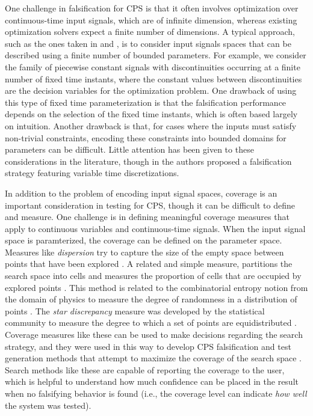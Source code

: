 One challenge in falsification for CPS is that it often
involves optimization over continuous-time input signals, which are of infinite 
dimension, whereas existing optimization solvers expect a finite number of 
dimensions. 
A typical approach, such as the ones taken in \cite{BreachCAV10} and 
\cite{Nghiem10}, is to consider input signals spaces that can be described using a
finite number of bounded parameters. For example, we consider the family of
piecewise constant signals with discontinuities occurring at a finite number of fixed time instants, where the
constant values between discontinuities are the decision variables for the optimization
problem. One drawback of using this type of fixed time parameterization 
is that the falsification performance depends on the selection of the fixed time instants, 
which is often based largely on intuition. Another drawback is that, for cases where the
inputs must satisfy non-trivial constraints, encoding these constraints 
into bounded domains for parameters can be difficult. Little attention has
been given to these considerations in the literature, though in 
\cite{DBLP:conf/atva/DeshmukhJKM15} the authors proposed a
falsification strategy featuring variable time discretizations.

In addition to the problem of encoding input signal spaces, coverage is an important consideration in testing for CPS, though it can be 
difficult to define and measure.
One challenge is in defining meaningful coverage measures that apply to continuous
variables and continuous-time signals. When the input signal space is paramterized, the coverage can be defined on the parameter space. 
Measures like \emph{dispersion} try to capture the size of the empty space between points that have been explored \cite{Esposito04}.
A related and simple measure, partitions the search space into cells and measures the proportion of cells that are occupied by explored points \cite{Skruch2011}.
This method is related to the combinatorial entropy notion from the domain of physics to measure the degree of randomness in a distribution of points \cite{Gabbay06}.
The \emph{star discrepancy} measure was developed by the statistical community 
to measure the degree to which a set of points are equidistributed
\cite{Heinrich03}. 
Coverage measures like these can be used to make decisions regarding the search strategy, and they were used in this way to develop CPS falsification and test generation methods that attempt to maximize the coverage of the search space \cite{DangN09,Dreossi2015,CAV2017}. Search methods like these are capable of reporting the coverage to the user, which is helpful to understand how much confidence 
can be placed in the result when no falsifying behavior is found (i.e., the coverage level can indicate \emph{how well} the system was tested). 

